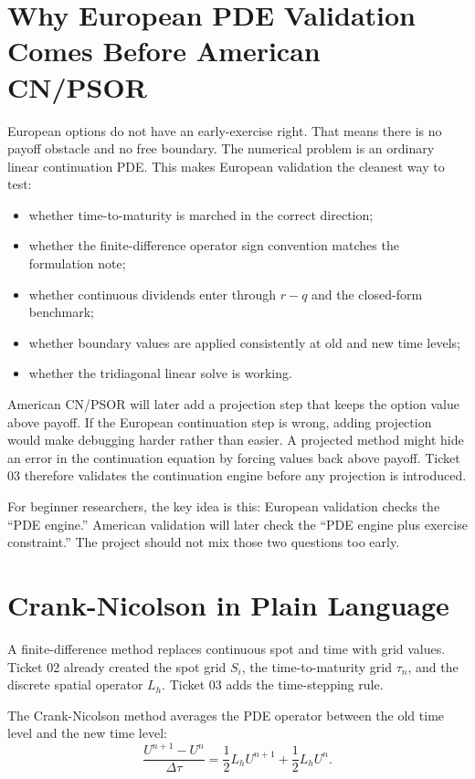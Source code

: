 \documentclass[11pt,a4paper]{article}
\begin{document}
\section{Why European PDE Validation Comes Before American CN/PSOR}

European options do not have an early-exercise right. That means there is no payoff obstacle and
no free boundary. The numerical problem is an ordinary linear continuation PDE. This makes
European validation the cleanest way to test:
\begin{itemize}
  \item whether time-to-maturity is marched in the correct direction;
  \item whether the finite-difference operator sign convention matches the formulation note;
  \item whether continuous dividends enter through \(r-q\) and the closed-form benchmark;
  \item whether boundary values are applied consistently at old and new time levels;
  \item whether the tridiagonal linear solve is working.
\end{itemize}

American CN/PSOR will later add a projection step that keeps the option value above payoff.
If the European continuation step is wrong, adding projection would make debugging harder rather
than easier. A projected method might hide an error in the continuation equation by forcing values
back above payoff. Ticket 03 therefore validates the continuation engine before any projection is
introduced.

For beginner researchers, the key idea is this: European validation checks the ``PDE engine.''
American validation will later check the ``PDE engine plus exercise constraint.'' The project
should not mix those two questions too early.

\section{Crank-Nicolson in Plain Language}

A finite-difference method replaces continuous spot and time with grid values. Ticket 02 already
created the spot grid \(S_i\), the time-to-maturity grid \(\tau_n\), and the discrete spatial
operator \(L_h\). Ticket 03 adds the time-stepping rule.

The Crank-Nicolson method averages the PDE operator between the old time level and the new time
level:
\begin{equation}
  \frac{U^{n+1} - U^n}{\Delta \tau}
  =
  \frac{1}{2}L_h U^{n+1}
  +
  \frac{1}{2}L_h U^n.
  \label{eq:cn-average}
\end{equation}
\end{document}
